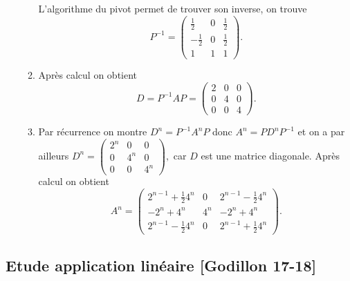 \begin{correction}
\begin{enumerate}
\begin{enumerate}
L'algorithme du pivot permet de trouver son inverse, on trouve 
$$P^{-1} = \left(\begin{array}{ccc}
\frac{1}{2}&0&\frac{1}{2}\\
-\frac{1}{2}&0&\frac{1}{2}\\
1&1&1
\end{array}
\right).$$
\item Après calcul on obtient 
$$D=P^{-1} A P =\left(\begin{array}{ccc}
2&0&0\\
0&4&0\\
0&0&4
\end{array}
\right).$$
\item Par récurrence on montre $D^n = P^{-1} A^n P$ donc $A^n = P D^n P^{-1}$  et on  a par ailleurs $D^n =\left(\begin{array}{ccc}
2^n&0&0\\
0&4^n&0\\
0&0&4^n
\end{array}
\right), $ car $D$ est une matrice diagonale. 
Après calcul on obtient 
$$A^n  = \left(\begin{array}{ccc}
2^{n-1} +\frac{1}{2} 4^n&0&2^{n-1} -\frac{1}{2} 4^n\\
-2^{n} + 4^n&4^n&-2^{n} + 4^n\\
2^{n-1} -\frac{1}{2} 4^n&0&2^{n-1} +\frac{1}{2} 4^n
\end{array}
\right). $$  
\end{enumerate}
\end{enumerate}
\end{correction}



\subsection{Etude application linéaire [Godillon 17-18]}

